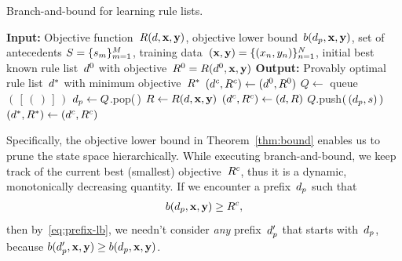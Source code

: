 \begin{algorithm}[t!]
\caption{Branch-and-bound for learning rule lists.}
\label{alg:branch-and-bound}
\begin{algorithmic}
\normalsize
\State \textbf{Input:} Objective function~$R({d}, \mathbf{x}, \mathbf{y})$,
objective lower bound~${b(d_p, \mathbf{x}, \mathbf{y})}$,
set of antecedents ${S = \{s_m\}_{m=1}^M}$,
training data~$(\mathbf{x}, \mathbf{y}) = {\{(x_n, y_n)\}_{n=1}^N}$,
initial best known rule list~$d^0$ with objective~${R^0 = R(d^0, \mathbf{x}, \mathbf{y})}$
\State \textbf{Output:} Provably optimal rule list~$d^*$ with minimum objective~$R^*$
\State $(d^c, {R^c}) \gets (d^0, R^0)$ 
\State $Q \gets $ queue$(\,[\,(\,)\,]\,)$ 
 
	\State $d_p \gets Q$.pop(\,) 
	 
        \State $R \gets R({d}, \mathbf{x}, \mathbf{y})$ 
        \If {$\Obj < \CurrentObj$}
            \State $(d^c, {R^c}) \gets ({d}, R)$ 
        \EndIf
             
                \State $Q$.push$(\,(d_p, s)\,)$ 
            \EndIf
        \EndFor
    \EndIf
\EndWhile
\State $(d^*, R^*) \gets (d^c, {R^c})$ 
\end{algorithmic}
\end{algorithm}

Specifically, the objective lower bound in Theorem~\ref{thm:bound}
enables us to prune the state space hierarchically.
%
While executing branch-and-bound, we keep track of the current best (smallest)
objective~${R^c}$, thus it is a dynamic, monotonically decreasing quantity.
%
If we encounter a prefix~$d_p$ such that
\begin{align}
b(\Prefix, \x, \y) \ge \CurrentObj,
\end{align}
then by~\eqref{eq:prefix-lb}, we needn't consider \emph{any} prefix~$d_p'$
that starts with~$d_p$, because ${b(d_p', \mathbf{x}, \mathbf{y}) \ge b(d_p, \mathbf{x}, \mathbf{y})}$.

